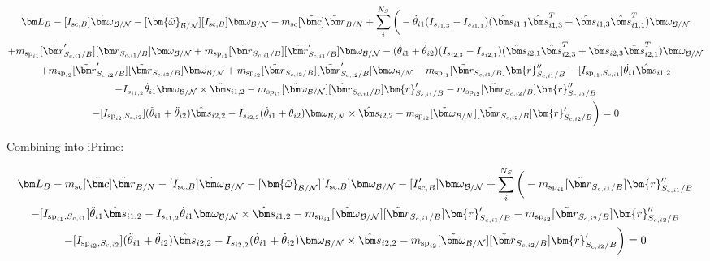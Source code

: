 \documentclass[paper]{aiaaNew}
\begin{document}
\begin{multline}
\bm L_B -[I_{\text{sc},B}] \dot{\bm\omega}_{\cal B/N} -[\bm{\tilde{\omega}}_{\cal B/N}] [I_{\text{sc},B}] \bm\omega_{\cal B/N} 
- m_{\text{sc}} [\tilde{\bm c}] \ddot{\bm r}_{B/N} 
+ \sum\limits_{i}^{N_S}\bigg( -\dot{\theta}_{i1} (I_{s_{i1,3}} - I_{s_{i1,1}})( \hat{\bm s}_{i1,1} \hat{\bm s}_{i1,3}^T + \hat{\bm s}_{i1,3} \hat{\bm s}_{i1,1}^T) \bm \omega_{\cal{B/N}} \\
+ m_{\text{sp}_{i1}} [\tilde{{\bm r}}'_{S_{c,i1}/B}] [\tilde{{\bm r}}_{S_{c,i1}/B}] \bm\omega_{\cal B/N} + m_{\text{sp}_{i1}} [\tilde{{\bm r}}_{S_{c,i1}/B}] [\tilde{{\bm r}}'_{S_{c,i1}/B}] \bm\omega_{\cal B/N} -(\dot{\theta}_{i1}  + \dot{\theta}_{i2})(I_{s_{i2,3}} - I_{s_{i2,1}}) (\hat{\bm s}_{i2,1} \hat{\bm s}_{i2,3}^T + \hat{\bm s}_{i2,3} \hat{\bm s}_{i2,1}^T) \bm \omega_{\cal{B/N}} 
\\
+ m_{\text{sp}_{i2}} [\tilde{{\bm r}}'_{S_{c,i2}/B}] [\tilde{{\bm r}}_{S_{c,i2}/B}] \bm\omega_{\cal B/N} +  m_{\text{sp}_{i2}} [\tilde{{\bm r}}_{S_{c,i2}/B}] [\tilde{{\bm r}}'_{S_{c,i2}/B}] \bm\omega_{\cal B/N}
- m_{\text{sp}_{i1}} [\tilde{{\bm r}}_{S_{c,i1}/B}] \bm{r}''_{S_{c,i1}/B} 
-[I_{\text{sp}_{i1},S_{c,i1}}] \ddot{\theta}_{i1} \hat{\bm s}_{i1,2} 
\\
-I_{s_{i1,2}} \dot{\theta}_{i1} \bm \omega_{\cal{B/N}} \times \hat{\bm s}_{i1,2} - m_{\text{sp}_{i1}} [\tilde{\bm\omega}_{\cal B/N}] [\tilde{{\bm r}}_{S_{c,i1}/B}] \bm{r}'_{S_{c,i1}/B}
- m_{\text{sp}_{i2}} [\tilde{{\bm r}}_{S_{c,i2}/B}] \bm{r}''_{S_{c,i2}/B}\\
-[I_{\text{sp}_{i2},S_{c,i2}}] (\ddot{\theta}_{i1}  + \ddot{\theta}_{i2})\hat{\bm s}_{i2,2} 
-I_{s_{i2,2}}  (\dot{\theta}_{i1}  + \dot{\theta}_{i2}) \bm \omega_{\cal{B/N}} \times \hat{\bm s}_{i2,2} - m_{\text{sp}_{i2}} [\tilde{\bm\omega}_{\cal B/N}] [\tilde{{\bm r}}_{S_{c,i2}/B}] \bm{r}'_{S_{c,i2}/B} \bigg) = 0
\end{multline}

Combining into iPrime:

\begin{multline}
\bm L_B - m_{\text{sc}} [\tilde{\bm c}] \ddot{\bm r}_{B/N} -[I_{\text{sc},B}] \dot{\bm\omega}_{\cal B/N} -[\bm{\tilde{\omega}}_{\cal B/N}] [I_{\text{sc},B}] \bm\omega_{\cal B/N} - [I'_{\text{sc},B}] \bm\omega_{\cal B/N}
+ \sum\limits_{i}^{N_S}\bigg(
- m_{\text{sp}_{i1}} [\tilde{{\bm r}}_{S_{c,i1}/B}] \bm{r}''_{S_{c,i1}/B} 
\\
-[I_{\text{sp}_{i1},S_{c,i1}}] \ddot{\theta}_{i1} \hat{\bm s}_{i1,2} 
-I_{s_{i1,2}} \dot{\theta}_{i1} \bm \omega_{\cal{B/N}} \times \hat{\bm s}_{i1,2} - m_{\text{sp}_{i1}} [\tilde{\bm\omega}_{\cal B/N}] [\tilde{{\bm r}}_{S_{c,i1}/B}] \bm{r}'_{S_{c,i1}/B}
- m_{\text{sp}_{i2}} [\tilde{{\bm r}}_{S_{c,i2}/B}] \bm{r}''_{S_{c,i2}/B}\\
-[I_{\text{sp}_{i2},S_{c,i2}}] (\ddot{\theta}_{i1}  + \ddot{\theta}_{i2})\hat{\bm s}_{i2,2} 
-I_{s_{i2,2}}  (\dot{\theta}_{i1}  + \dot{\theta}_{i2}) \bm \omega_{\cal{B/N}} \times \hat{\bm s}_{i2,2} - m_{\text{sp}_{i2}} [\tilde{\bm\omega}_{\cal B/N}] [\tilde{{\bm r}}_{S_{c,i2}/B}] \bm{r}'_{S_{c,i2}/B} \bigg) = 0
\end{multline}
\end{document}

